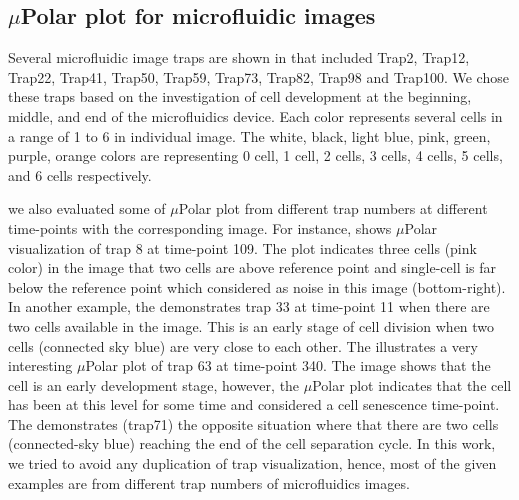 \documentclass[conference]{IEEEtran}
\begin{document}

\subsection{$\mu$Polar plot for microfluidic images}
Several microfluidic image traps are shown in  that included Trap2, Trap12, Trap22, Trap41, Trap50, Trap59, Trap73, Trap82, Trap98 and Trap100. We chose these traps based on the investigation of cell development at the beginning, middle, and end of the microfluidics device. Each color represents several cells in a range of 1 to 6 in individual image. The white, black, light blue, pink, green, purple, orange colors are representing 0 cell, 1 cell, 2 cells, 3 cells, 4 cells, 5 cells, and 6 cells respectively.

we also evaluated some of $\mu$Polar plot from different trap numbers at different time-points with the corresponding image. For instance,  shows $\mu$Polar visualization of trap 8 at time-point 109. The plot indicates three cells (pink color) in the image that two cells are above reference point and single-cell is far below the reference point which considered as noise in this image (bottom-right). In another example, the  demonstrates trap 33 at time-point 11 when there are two cells available in the image. This is an early stage of cell division when two cells (connected sky blue) are very close to each other.  The  illustrates a very interesting $\mu$Polar plot of trap 63 at time-point 340. The image shows that the cell is an early development stage, however, the $\mu$Polar plot indicates that the cell has been at this level for some time and considered a cell senescence time-point. The  demonstrates (trap71) the opposite situation where that there are two cells (connected-sky blue) reaching the end of the cell separation cycle. In this work, we tried to avoid any duplication of trap visualization, hence, most of the given examples are from different trap numbers of microfluidics images.    
\end{document}
